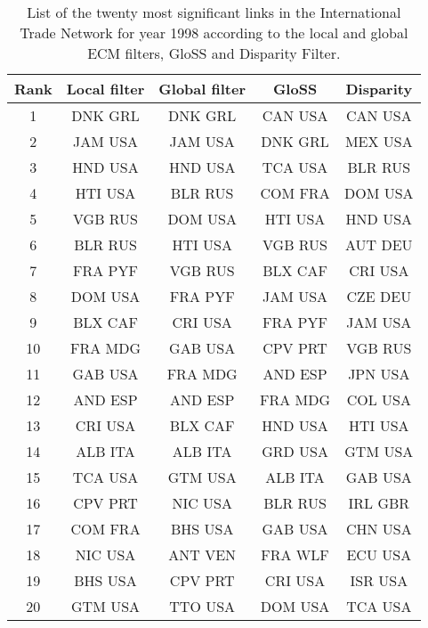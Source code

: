\documentclass[aps,twocolumn,superscriptaddress]{revtex4-1}
\begin{document}
\begin{table}[ht!]
\centering
 \begin{small}
 \begin{tabular}{||c|c|c|c|c||} 
 \hline
 Rank & Local filter & Global filter & GloSS & Disparity\\ [0.5ex] 
 \hline\hline
 1 & DNK GRL & DNK GRL & CAN USA & CAN USA \\ \hline
 2 & JAM USA & JAM USA & DNK GRL & MEX USA \\ \hline
 3 & HND USA & HND USA & TCA USA & BLR RUS \\ \hline
 4 & HTI USA & BLR RUS & COM FRA & DOM USA \\ \hline
 5 & VGB RUS & DOM USA & HTI USA & HND USA \\ \hline
 6 & BLR RUS & HTI USA & VGB RUS & AUT DEU \\ \hline
 7 & FRA PYF & VGB RUS & BLX CAF & CRI USA \\ \hline
 8 & DOM USA & FRA PYF & JAM USA & CZE DEU \\ \hline
 9 & BLX CAF & CRI USA & FRA PYF & JAM USA \\ \hline
 10 & FRA MDG & GAB USA & CPV PRT & VGB RUS \\ \hline
 11 & GAB USA & FRA MDG & AND ESP & JPN USA \\ \hline
 12 & AND ESP & AND ESP & FRA MDG & COL USA \\ \hline
 13 & CRI USA & BLX CAF & HND USA & HTI USA \\ \hline
 14 & ALB ITA & ALB ITA & GRD USA & GTM USA \\ \hline
 15 & TCA USA & GTM USA & ALB ITA & GAB USA \\ \hline
 16 & CPV PRT & NIC USA & BLR RUS & IRL GBR \\ \hline
 17 & COM FRA & BHS USA & GAB USA & CHN USA \\ \hline
 18 & NIC USA & ANT VEN & FRA WLF & ECU USA \\ \hline
 19 & BHS USA & CPV PRT & CRI USA & ISR USA \\ \hline
 20 & GTM USA & TTO USA & DOM USA & TCA USA \\ \hline
\end{tabular}
\end{small}
%
\caption{List of the twenty most significant links in the International Trade Network for year 1998 according to the local and global ECM filters, GloSS and Disparity Filter.}
\label{tab:tvg_trade_1998_top_20_signific}
\end{table}
%
% 
\end{document}
